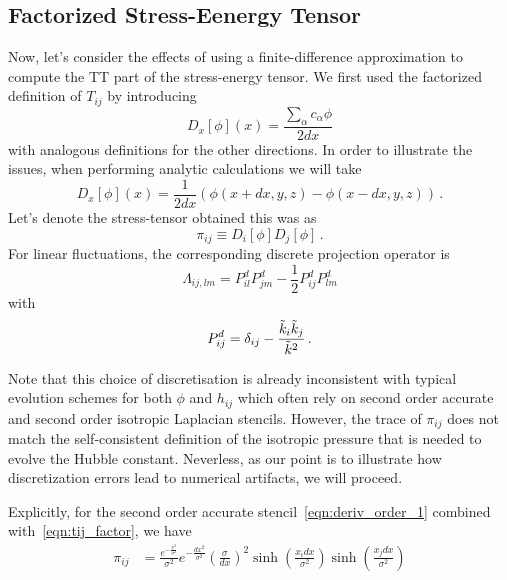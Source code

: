 \documentclass{revtex4}
\begin{document}
\subsection{Factorized Stress-Eenergy Tensor}
Now, let's consider the effects of using a finite-difference approximation to compute the TT part of the stress-energy tensor.
We first used the factorized definition of $T_{ij}$ by introducing
\begin{equation}
  D_x[\phi](x) = \frac{\sum_{\alpha}c_\alpha \phi}{2dx}
\end{equation}
with analogous definitions for the other directions.
In order to illustrate the issues, when performing analytic calculations we will take
\begin{equation}
  \label{eqn:deriv_order_1}
  D_x[\phi](x) = \frac{1}{2dx}\left(\phi(x+dx,y,z)-\phi(x-dx,y,z)\right) \, .
\end{equation}
Let's denote the stress-tensor obtained this was as
\begin{equation}
  \label{eqn:tij_factor}
  \pi_{ij} \equiv D_i[\phi]D_j[\phi] \, .
\end{equation}
For linear fluctuations, the corresponding discrete projection operator is
\begin{equation}
  \Lambda_{ij,lm} = P^{d}_{il}P^{d}_{jm} - \frac{1}{2}P^d_{ij}P^{d}_{lm}
\end{equation}
with
\begin{equation}
  P^{d}_{ij} = \delta_{ij} - \frac{\tilde{k}_i\tilde{k}_j}{\tilde{k}^2} \, .
\end{equation}

Note that this choice of discretisation is already inconsistent with typical evolution schemes for both $\phi$ and $h_{ij}$ which often rely on second order accurate and second order isotropic Laplacian stencils.   However, the trace of $\pi_{ij}$ does not match the self-consistent definition of the isotropic pressure that is needed to evolve the Hubble constant.
Neverless, as our point is to illustrate how discretization errors lead to numerical artifacts, we will proceed.

Explicitly, for the second order accurate stencil~\eqref{eqn:deriv_order_1} combined with~\eqref{eqn:tij_factor}, we have
\begin{align}
  \pi_{ij} &= \frac{e^{-\frac{x^2}{\sigma^2}}}{\sigma^2}e^{-\frac{dx^2}{\sigma^2}}\left(\frac{\sigma}{dx}\right)^2\sinh\left(\frac{x_idx}{\sigma^2}\right)\sinh\left(\frac{x_jdx}{\sigma^2}\right) 
\end{align}
\end{document}
